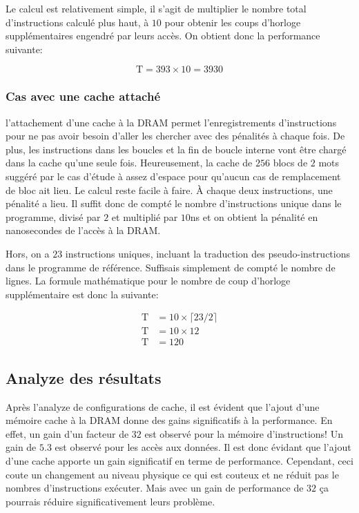 \documentclass[a11paper]{article}
\begin{document}
Le calcul est relativement simple, il s'agit de multiplier le nombre total
d'instructions calculé plus haut, à $10$ pour obtenir les coups d'horloge
supplémentaires engendré par leurs accès. On obtient donc la performance
suivante:

\begin{equation}
  \text{T}=393\times10=3930
\end{equation}

\subsubsection{Cas avec une cache attaché}

l'attachement d'une cache à la DRAM permet l'enregistrements d'instructions
pour ne pas avoir besoin d'aller les chercher avec des pénalités à chaque
fois. De plus, les instructions dans les boucles et la fin de boucle interne
vont être chargé dans la cache qu'une seule fois. Heureusement, la cache de
$256$ blocs de $2$ mots suggéré par le cas d'étude à assez d'espace pour
qu'aucun cas de remplacement de bloc ait lieu. Le calcul reste facile à
faire. À chaque deux instructions, une pénalité a lieu. Il suffit donc de
compté le nombre d'instructions unique dans le programme, divisé par $2$ et
multiplié par $10$ns et on obtient la pénalité en nanosecondes de l'accès à
la DRAM.

Hors, on a $23$ instructions uniques, incluant la traduction des
pseudo-instructions dans le programme de référence. Suffisais simplement de
compté le nombre de lignes. La formule mathématique pour le nombre de coup 
d'horloge supplémentaire est donc la suivante:

\begin{align}
  \text{T} &= 10\times\lceil23/2\rceil \\
  \text{T} &= 10\times12 \\
  \text{T} &= 120
\end{align}

\subsection{Analyze des résultats}

Après l'analyze de configurations de cache, il est évident que l'ajout d'une
mémoire cache à la DRAM donne des gains significatifs à la performance. 
En effet, un gain d'un facteur de $32$ est observé pour la mémoire
d'instructions! Un gain de $5.3$ est observé pour les accès aux données.
Il est donc évidant que l'ajout d'une cache apporte un gain significatif en
terme de performance. Cependant, ceci coute un changement au niveau physique
ce qui est couteux et ne réduit pas le nombres d'instructions exécuter. Mais
avec un gain de performance de $32$ ça pourrais réduire significativement leurs
problème.
\end{document}
